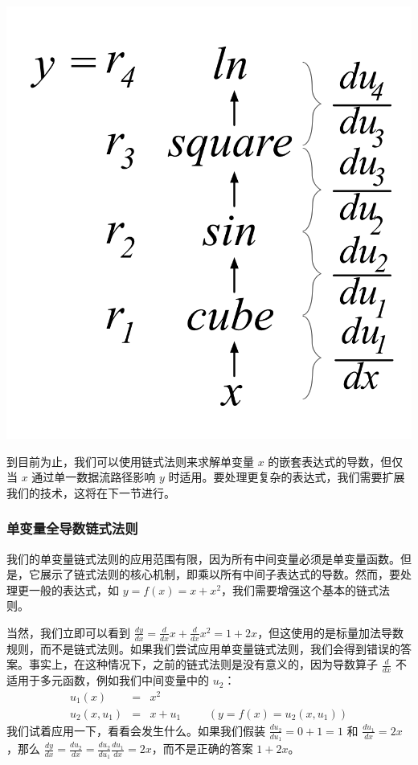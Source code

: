 \documentclass[11pt]{article}
\begin{document}
\begin{center}
\includegraphics{chain-tree.png}
\end{center}

到目前为止，我们可以使用链式法则来求解单变量 $x$ 的嵌套表达式的导数，但仅当 $x$ 通过单一数据流路径影响 $y$ 时适用。要处理更复杂的表达式，我们需要扩展我们的技术，这将在下一节进行。


\subsubsection{单变量全导数链式法则}\label{sec4.5.2}

我们的单变量链式法则的应用范围有限，因为所有中间变量必须是单变量函数。但是，它展示了链式法则的核心机制，即乘以所有中间子表达式的导数。然而，要处理更一般的表达式，如 $y = f(x) = x + x^2$，我们需要增强这个基本的链式法则。

当然，我们立即可以看到 $\frac{dy}{dx} = \frac{d}{dx}x + \frac{d}{dx}x^2 = 1 + 2x$，但这使用的是标量加法导数规则，而不是链式法则。如果我们尝试应用单变量链式法则，我们会得到错误的答案。事实上，在这种情况下，之前的链式法则是没有意义的，因为导数算子 $\frac{d}{dx}$ 不适用于多元函数，例如我们中间变量中的 $u_2$：
\[
\begin{array}{lllllllll}
 u_1(x) &=& x^2\\
 u_2(x,u_1) &=& x + u_1 & & & (y = f(x) = u_2(x,u_1))
\end{array}
\]
我们试着应用一下，看看会发生什么。如果我们假装 $\frac{du_2}{du_1} = 0 + 1 = 1$ 和 $\frac{du_1}{dx} = 2x$，那么 $\frac{dy}{dx} = \frac{du_2}{dx} = \frac{du_2}{du_1} \frac{du_1}{dx} = 2x$，而不是正确的答案 $1 + 2x$。
\end{document}
